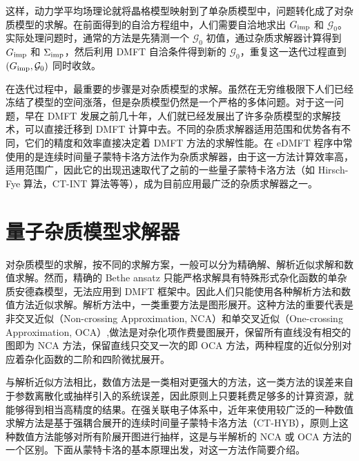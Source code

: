 这样，动力学平均场理论就将晶格模型映射到了单杂质模型中，问题转化成了对杂质模型的求解。在前面得到的自洽方程组中，人们需要自洽地求出 $G_{\mathrm{imp}}$ 和 $\mathcal{G}_0$。实际处理问题时，通常的方法是先猜测一个 $\mathcal{G}_0$ 初值，通过杂质求解器计算得到 $G_{\mathrm{imp}}$ 和 $\Sigma_{\mathrm{imp}}$，然后利用 DMFT 自洽条件得到新的 $\mathcal{G}_0$，重复这一迭代过程直到 $(G_{\mathrm{imp}},\mathcal{G}_0)$ 同时收敛。

在迭代过程中，最重要的步骤是对杂质模型的求解。虽然在无穷维极限下人们已经冻结了模型的空间涨落，但是杂质模型仍然是一个严格的多体问题。对于这一问题，早在 DMFT 发展之前几十年，人们就已经发展出了许多杂质模型的求解技术，可以直接迁移到 DMFT 计算中去。不同的杂质求解器适用范围和优势各有不同，它们的精度和效率直接决定着 DMFT 方法的求解性能。在 eDMFT 程序中常使用的是连续时间量子蒙特卡洛方法作为杂质求解器\cite{RevModPhys.83.349}，由于这一方法计算效率高，适用范围广，因此它的出现迅速取代了之前的一些量子蒙特卡洛方法（如 Hirsch-Fye 算法\cite{PhysRevLett.56.2521}，CT-INT 算法\cite{PhysRevB.72.035122}等等），成为目前应用最广泛的杂质求解器之一。
\section{量子杂质模型求解器}
对杂质模型的求解，按不同的求解方案，一般可以分为精确解、解析近似求解和数值求解。然而，精确的 Bethe ansatz 只能严格求解具有特殊形式杂化函数的单杂质安德森模型，无法应用到 DMFT 框架中。因此人们只能使用各种解析方法和数值方法近似求解。解析方法中，一类重要方法是图形展开。这种方法的重要代表是非交叉近似（Non-crossing Approximation, NCA）\cite{RevModPhys.59.845}和单交叉近似（One-crossing Approximation, OCA）\cite{PhysRevB.64.155111},做法是对杂化项作费曼图展开，保留所有直线没有相交的图即为 NCA 方法，保留直线只交叉一次的即 OCA 方法，两种程度的近似分别对应着杂化函数的二阶和四阶微扰展开。

与解析近似方法相比，数值方法是一类相对更强大的方法，这一类方法的误差来自于参数离散化或抽样引入的系统误差，因此原则上只要耗费足够多的计算资源，就能够得到相当高精度的结果。在强关联电子体系中，近年来使用较广泛的一种数值求解方法是基于强耦合展开的连续时间量子蒙特卡洛方法（CT-HYB），原则上这种数值方法能够对所有阶展开图进行抽样，这是与半解析的 NCA 或 OCA 方法的一个区别\cite{PhysRevLett.97.076405}。下面从蒙特卡洛的基本原理出发，对这一方法作简要介绍。
